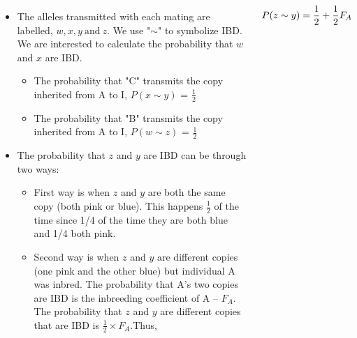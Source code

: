 \documentclass[11pt,dvipsnames,ignorenonframetext,aspectratio=169]{beamer}
\begin{document}
\begin{frame}{}
\protect\hypertarget{section-1}{}
\begin{columns}
\begin{itemize}
\footnotesize
\item The alleles transmitted with each mating are labelled, $w, x, y~\text{and}~z$. We use "$\sim$" to symbolize IBD. We are interested to calculate the probability that $w$ and $x$ are IBD.
  \begin{itemize}
  \scriptsize
  \item The probability that "C" transmits the copy inherited from A to I, $P(x \sim y)$ = $\frac{1}{2}$
  \item The probability that "B" transmits the copy inherited from A to I, $P(w \sim z)$ = $\frac{1}{2}$
\end{itemize}
\item The probability that $z$ and $y$ are IBD can be through two ways:
  \begin{itemize}
  \scriptsize
  \item First way is when $z$ and $y$ are both the same copy (both pink or blue). This happens $\frac{1}{2}$ of the time since 1/4 of the time they are both blue and 1/4 both pink.
  \item Second way is when $z$ and $y$ are different copies (one pink and the other blue) but individual A was inbred. The probability that A's two copies are IBD is the inbreeding coefficient of A -- $F_A$. The probability that $z$ and $y$ are different copies that are IBD is $\frac{1}{2}\times F_A$.Thus,
  \end{itemize}
\end{itemize}

$$
\small
P(z \sim y) = \frac{1}{2} + \frac{1}{2}F_A
$$


\end{columns}
\end{frame}
\end{document}
